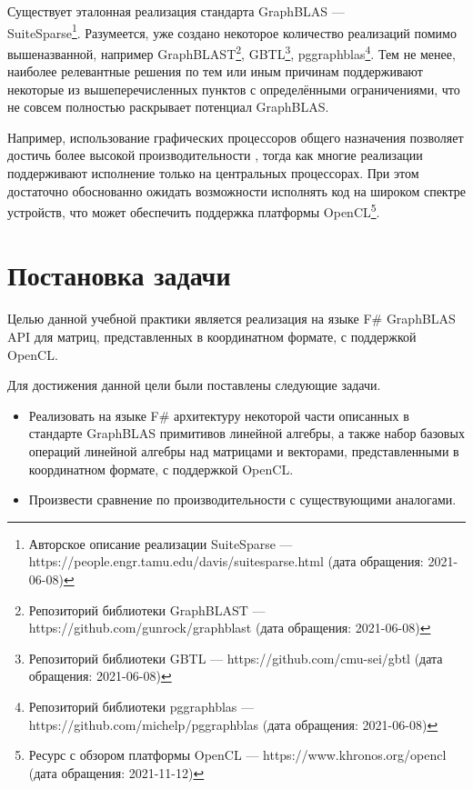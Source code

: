 \documentclass[14pt]{matmex-diploma-custom}
\begin{document}
Существует эталонная реализация стандарта GraphBLAS ---\\ SuiteSparse\footnote{Авторское описание реализации SuiteSparse --- https://people.engr.tamu.edu/davis/suitesparse.html (дата обращения: 2021-06-08)}. Разумеется, уже создано некоторое количество реализаций помимо вышеназванной, например GraphBLAST\footnote{Репозиторий библиотеки GraphBLAST --- https://github.com/gunrock/graphblast (дата обращения: 2021-06-08)}, GBTL\footnote{Репозиторий библиотеки GBTL --- https://github.com/cmu-sei/gbtl (дата обращения: 2021-06-08)}, pggraphblas\footnote{Репозиторий библиотеки pggraphblas --- https://github.com/michelp/pggraphblas (дата обращения: 2021-06-08)}. Тем не менее, наиболее релевантные решения по тем или иным причинам поддерживают некоторые из вышеперечисленных пунктов с определёнными ограничениями, что не совсем полностью раскрывает потенциал GraphBLAS.

Например, использование графических процессоров общего назначения позволяет достичь более высокой производительности \cite{GraphBLAST}, тогда как многие реализации поддерживают исполнение только на центральных процессорах. При этом достаточно обоснованно ожидать возможности исполнять код на широком спектре устройств, что может обеспечить поддержка платформы OpenCL\footnote{Ресурс с обзором платформы OpenCL --- https://www.khronos.org/opencl (дата обращения: 2021-11-12)}.

\section{Постановка задачи}
\paragraph{} Целью данной учебной практики является реализация на языке F\# GraphBLAS API для матриц, представленных в координатном формате, с поддержкой OpenCL.

Для достижения данной цели были поставлены следующие задачи.
\begin{itemize}
    \item Реализовать на языке F\# архитектуру некоторой части описанных в стандарте GraphBLAS примитивов линейной алгебры, а также набор базовых операций линейной алгебры над матрицами и векторами, представленными в координатном формате, с поддержкой OpenCL.
    \item Произвести сравнение по производительности с существующими аналогами.
\end{itemize}
\end{document}
